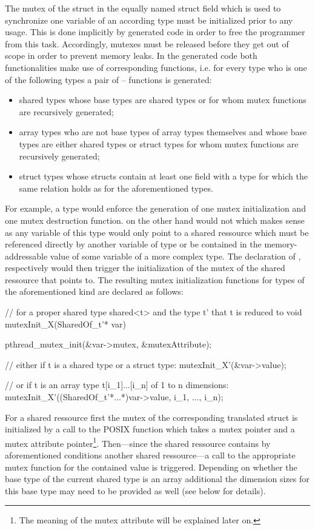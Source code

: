 The mutex of the struct  in the equally named struct field  which is used to synchronize one variable of an according type  must be initialized prior to any usage. This is done implicitly by generated code in order to free the programmer from this task. Accordingly, mutexes must be released before they get out of scope in order to prevent memory leaks. In the generated code both functionalities make use of corresponding functions, i.e. for every type who is one of the following types a pair of -- functions is generated:

\begin{itemize}
\item shared types whose base types are shared types or for whom mutex functions are recursively generated;
\item array types who are not base types of array types themselves and whose base types are either shared types or struct types for whom mutex functions are recursively generated;
\item struct types whose structs contain at least one field with a type for which the same relation holds as for the aforementioned types.
\end{itemize}

For example, a type  would enforce the generation of one mutex initialization and one mutex destruction function.  on the other hand would not which makes sense as any variable  of this type would only point to a shared ressource which must be referenced directly by another variable  of type  or be contained in the memory-addressable value of some variable  of a more complex type. The declaration of , respectively  would then trigger the initialization of the mutex of the shared ressource that  points to. The resulting mutex initialization functions for types of the aforementioned kind are declared as follows:

\begin{ccode}
// for a proper shared type shared<t> and the type t' that t is reduced to
void mutexInit_X(SharedOf_t'* var) { 
  pthread_mutex_init(&var->mutex, &mutexAttribute);
  
  // either if t is a shared type or a struct type:
  mutexInit_X'(&var->value); 
  
  // or if t is an array type t[i_1]...[i_n] of 1 to n dimensions:
  mutexInit_X'((SharedOf_t'*...*)var->value, i_1, ..., i_n); 
}
\end{ccode}
For a shared ressource first the mutex of the corresponding translated struct is initialized by a call to the POSIX function  which takes a mutex pointer and a mutex attribute pointer\footnote{The meaning of the mutex attribute will be explained later on.}. Then---since the shared ressource contains by aforementioned conditions another shared ressource---a call to the appropriate mutex function for the contained value is triggered. Depending on whether the base type of the current shared type is an array additional the dimension sizes for this base type may need to be provided as well (see below for details).

